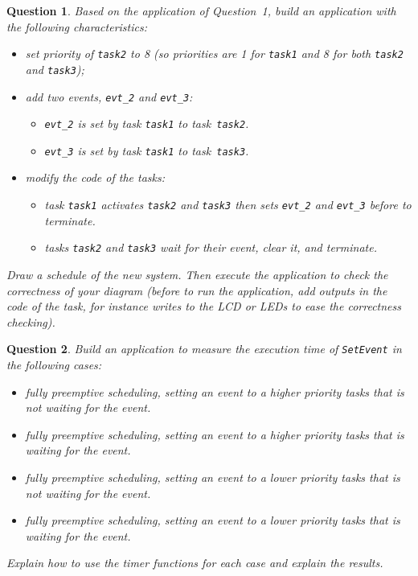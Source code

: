 \documentclass[11pt]{report}
\newtheorem{ex}{Question}
\begin{document}
\begin{ex}
     Based on the application of Question~1, build an application with the following characteristics:
\begin{itemize}
    \item set priority of \texttt{task2} to 8 (so priorities are 1 for \texttt{task1} and 8 for both \texttt{task2} and \texttt{task3});
    \item add two events, \texttt{evt\_2} and \texttt{evt\_3}:
        \begin{itemize}
            \item \texttt{evt\_2} is set by task \texttt{task1} to task \texttt{task2}.
            \item \texttt{evt\_3} is set by task \texttt{task1} to task \texttt{task3}.
        \end{itemize}
    \item modify the code of the tasks:
        \begin{itemize}
            \item task \texttt{task1} activates \texttt{task2} and \texttt{task3} then sets \texttt{evt\_2} and \texttt{evt\_3} before to terminate.
            \item tasks \texttt{task2} and \texttt{task3} wait for their event, clear it, and terminate.
        \end{itemize}
\end{itemize}

Draw a schedule of the new system.
Then execute the application to check the correctness of your diagram (before to run the application, add outputs in the code of the task, for instance writes to the LCD or LEDs to ease the correctness checking).

\end{ex}

\begin{ex}
    Build an application to measure the execution time of \texttt{SetEvent} in the following cases:
    \begin{itemize}
        \item fully preemptive scheduling, setting an event to a higher priority tasks that is not waiting for the event.
        \item fully preemptive scheduling, setting an event to a higher priority tasks that is waiting for the event.
        \item fully preemptive scheduling, setting an event to a lower priority tasks that is not waiting for the event.
        \item fully preemptive scheduling, setting an event to a lower priority tasks that is waiting for the event.
    \end{itemize}

    Explain how to use the timer functions for each case and explain the results.
\end{ex}
\end{document}
